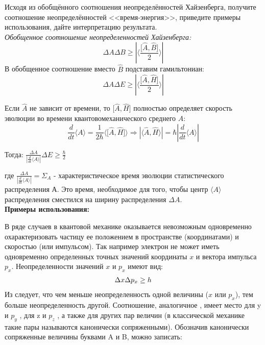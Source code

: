 \documentclass[__main__.tex]{subfiles}
\begin{document}
Исходя из обобщённого соотношения неопределённостей Хайзенберга, получите соотношение неопределённостей <<время-энергия>>, приведите примеры использования, дайте интерпретацию результата.\\ 

\textit{Обобщенное соотношение неопределенностей Хайзенберга:}
$$\Delta A \Delta B \ge \left| \Big \langle \frac { \lbrack \widehat{A}, \widehat{B} \rbrack}{2} \Big \rangle \right| $$
В обобщенное соотношение вместо $\widehat{B}$ подставим гамильтониан:
$$\Delta A \Delta E \ge \left| \Big \langle \frac { \lbrack \widehat{A}, \widehat{H} \rbrack}{2} \Big \rangle \right|$$

Если $\widehat{A}$ не зависит от времени, то $\lbrack \widehat{A}, \widehat{H} \rbrack$ полностью определяет скорость эволюции во времени
квантовомеханического среднего $A$:\\

$$\frac{d}{dt}\langle A \rangle = \frac{1}{2 \hbar} \langle \lbrack \widehat{A}, \widehat{H} \rbrack \rangle \Rightarrow \left| \langle \widehat{A}, \widehat{H}\rangle \right| = \hbar \left| \frac{d}{dt}\langle A \rangle \right|$$

Тогда: $\frac{\Delta A}{\left| \frac{d}{dt} \langle A \rangle \right| } \Delta E \ge \frac{\hbar}{2}$

где $\frac{\Delta A}{\left| \frac{d}{dt} \langle A \rangle \right| } = \Sigma_A $ - характеристическое время эволюции статистического распределения А. Это время, необходимое для того, чтобы центр $\langle A \rangle$ распределения сместился на ширину распределения $\Delta A$. \\

\textbf{Примеры использования:}

В ряде случаев в квантовой механике оказывается невозможным одновременно охарактеризовать частицу ее положением в пространстве (координатами) и скоростью (или импульсом). Так например электрон не может иметь одновременно определенных точных значений координаты $x$ и вектора импульса $p_{x}$. Неопределенности значений  $x$ и $p_{x}$ имеют вид:
\begin{gather}
	\llabel{_28:neop}
	\Delta x\Delta p_{x}\geq h
\end{gather}
Из  следует, что чем меньше неопределенность одной величины ($x$ или  $p_x$), тем больше неопределенность другой.
Соотношение, аналогичное , имеет место для y и  $p_{y}$  , для z и  $p_{z}$  , а также для других пар величин (в классической механике такие пары называются канонически сопряженными). Обозначив канонически сопряженные величины буквами A и B, можно записать:
\end{document}
